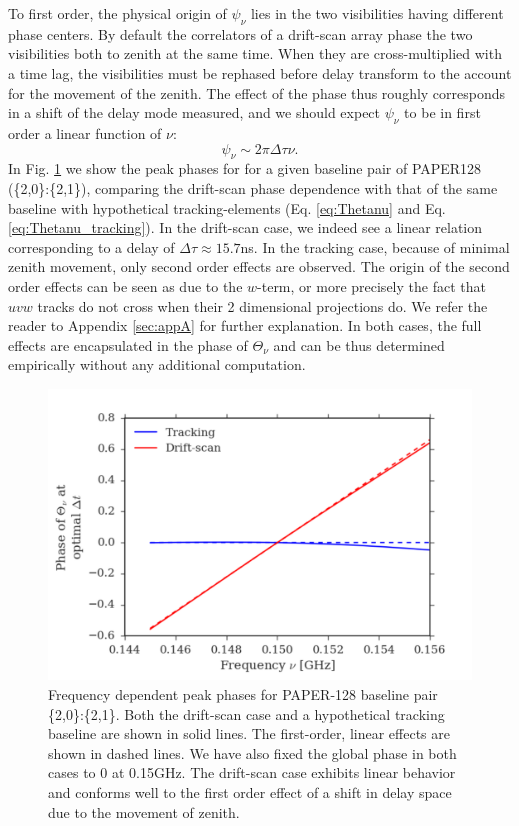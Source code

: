 \documentclass[twocolumn,apj,numberedappendix]{emulateapj}
\renewcommand\[{\begin{equation}}
\renewcommand\]{\end{equation}}
\begin{document}
To first order, the physical origin of $\psi_\nu$ lies in the two visibilities having different phase centers. By default the correlators of a drift-scan array phase the two visibilities both to zenith at the same time. When they are cross-multiplied with a time lag, the visibilities must be rephased before delay transform to the account for the movement of the zenith. The effect of the phase thus roughly corresponds in a shift of the delay mode measured, and we should expect $\psi_{\nu}$ to be in first order a linear function of $\nu$:
\[
\psi_{\nu}\sim 2\pi\Delta\tau\nu.
\]
In Fig. \ref{fig:phi_nu} we show the peak phases for for a given baseline pair of PAPER128 (\{2,0\}:\{2,1\}), comparing the drift-scan phase dependence with that of the same baseline with hypothetical tracking-elements (Eq. \eqref{eq:Thetanu} and Eq. \eqref{eq:Thetanu_tracking}). In the drift-scan case, we indeed see a linear relation corresponding to a delay of $\Delta\tau\approx15.7$ns. In the tracking case, because of minimal zenith movement, only second order effects are observed. The origin of the second order effects can be seen as due to the $w$-term, or more precisely the fact that $uvw$ tracks do not cross when their 2 dimensional projections do. We refer the reader to Appendix \ref{sec:appA} for further explanation. In both cases, the full effects are encapsulated in the phase of $\Theta_\nu$ and can be thus determined empirically without any additional computation. 

\begin{figure}[H]
\includegraphics[width=1\linewidth]{phi_nu}

\caption{Frequency dependent peak phases for PAPER-128 baseline pair \{2,0\}:\{2,1\}. Both the drift-scan case and a hypothetical tracking baseline are shown in solid lines. The first-order, linear effects are shown in dashed lines. We have also fixed the global phase in both cases to 0 at 0.15GHz. The drift-scan case exhibits linear behavior and conforms well to the first order effect of a shift in delay space due to the movement of zenith. }
\label{fig:phi_nu}
\end{figure}
\end{document}
